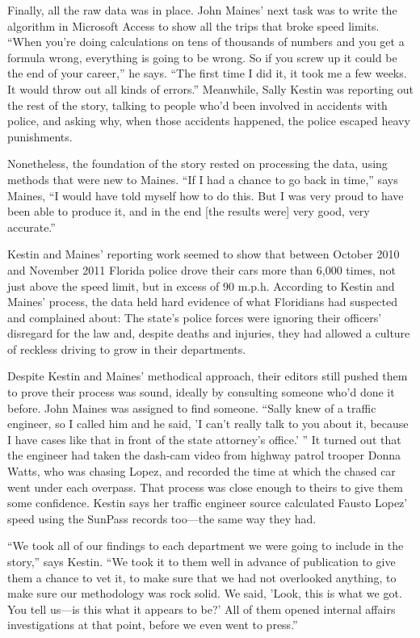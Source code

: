 Finally, all the raw data was in place. John Maines' next task was to write the
algorithm in Microsoft Access to show all the trips that broke speed limits.
``When you're doing calculations on tens of thousands of numbers and you
get a formula wrong, everything is going to be wrong. So if you screw up
it could be the end of your career,'' he says. ``The first time I did it, it took
me a few weeks. It would throw out all kinds of errors.'' Meanwhile, Sally
Kestin was reporting out the rest of the story, talking to people who'd been
involved in accidents with police, and asking why, when those accidents
happened, the police escaped heavy punishments.

Nonetheless, the foundation of the story rested on processing the data,
using methods that were new to Maines. ``If I had a chance to go back in
time,'' says Maines, ``I would have told myself how to do this. But I was very
proud to have been able to produce it, and in the end [the results were] very
good, very accurate.''

Kestin and Maines' reporting work seemed to show that between October
2010 and November 2011 Florida police drove their cars more than 6,000
times, not just above the speed limit, but in excess of 90 m.p.h. According to
Kestin and Maines' process, the data held hard evidence of what Floridians
had suspected and complained about: The state's police forces were ignoring
their officers' disregard for the law and, despite deaths and injuries, they
had allowed a culture of reckless driving to grow in their departments.

Despite Kestin and Maines' methodical approach, their editors still pushed
them to prove their process was sound, ideally by consulting someone who'd
done it before. John Maines was assigned to find someone. ``Sally knew of a
traffic engineer, so I called him and he said, 'I can't really talk to you about
it, because I have cases like that in front of the state attorney's office.' '' It
turned out that the engineer had taken the dash-cam video from highway
patrol trooper Donna Watts, who was chasing Lopez, and recorded the
time at which the chased car went under each overpass. That process was
close enough to theirs to give them some confidence. Kestin says her traffic
engineer source calculated Fausto Lopez' speed using the SunPass records
too—the same way they had.

``We took all of our findings to each department we were going to include in
the story,'' says Kestin. ``We took it to them well in advance of publication to
give them a chance to vet it, to make sure that we had not overlooked anything,
to make sure our methodology was rock solid. We said, 'Look, this is
what we got. You tell us—is this what it appears to be?' All of them opened
internal affairs investigations at that point, before we even went to press.''


